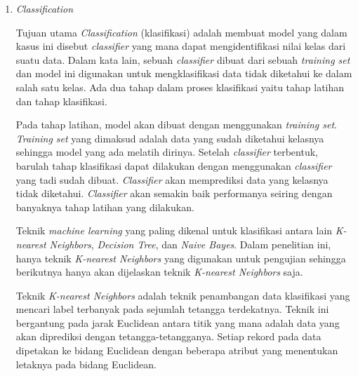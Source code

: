 \documentclass[a4paper,twoside]{article}
\begin{document}
\begin{enumerate}
\begin{itemize}
\end{itemize}

		\begin{enumerate}
			\item \textit{Classification}
			
			Tujuan utama \textit{Classification} (klasifikasi) adalah membuat model yang dalam kasus ini disebut \textit{classifier} yang mana dapat mengidentifikasi nilai kelas dari suatu data. Dalam kata lain, sebuah \textit{classifier} dibuat dari sebuah \textit{training set} dan model ini digunakan untuk mengklasifikasi data tidak diketahui ke dalam salah satu kelas. Ada dua tahap dalam proses klasifikasi yaitu tahap latihan dan tahap klasifikasi.

			Pada tahap latihan, model akan dibuat dengan menggunakan \textit{training set}. \textit{Training set} yang dimaksud adalah data yang sudah diketahui kelasnya sehingga model yang ada melatih dirinya. Setelah \textit{classifier} terbentuk, barulah tahap klasifikasi dapat dilakukan dengan menggunakan \textit{classifier} yang tadi sudah dibuat. \textit{Classifier} akan memprediksi data yang kelasnya tidak diketahui. \textit{Classifier} akan semakin baik performanya seiring dengan banyaknya tahap latihan yang dilakukan.

			Teknik \textit{machine learning} yang paling dikenal untuk klasifikasi antara lain \textit{K-nearest Neighbors}, \textit{Decision Tree}, dan \textit{Naive Bayes}. Dalam penelitian ini, hanya teknik \textit{K-nearest Neighbors} yang digunakan untuk pengujian sehingga berikutnya hanya akan dijelaskan teknik \textit{K-nearest Neighbors} saja.

			Teknik \textit{K-nearest Neighbors} adalah teknik penambangan data klasifikasi yang mencari label terbanyak pada sejumlah tetangga terdekatnya. Teknik ini bergantung pada jarak Euclidean antara titik yang mana adalah data yang akan diprediksi dengan tetangga-tetangganya. Setiap rekord pada data dipetakan ke bidang Euclidean dengan beberapa atribut yang menentukan letaknya pada bidang Euclidean. 


\end{enumerate}
\end{enumerate}
\end{document}
